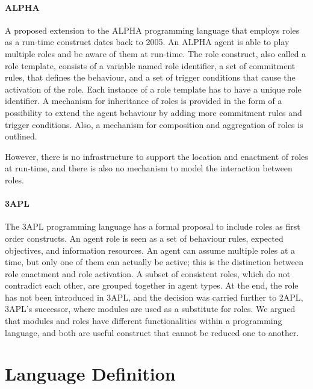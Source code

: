 \documentclass[a4paper,12pt,oneside,fleqn]{book} %
\begin{document}
{%

\subsubsection{ALPHA} %
A proposed extension to the ALPHA programming language that employs roles
as a run-time construct dates back to 2005\cite{Collier_arole-based}. An
ALPHA agent is able to play multiple roles and be aware of them at
run-time. The role construct, also called a role template, consists of a
variable named role identifier, a set of commitment rules, that defines the
behaviour, and a set of trigger conditions that cause the activation of
the role. Each instance of a role template has to have a unique role
identifier. A mechanism for inheritance of roles is provided in the form of
a possibility to  extend the agent behaviour by adding more commitment
rules and trigger conditions.  Also, a mechanism for composition and
aggregation of roles is outlined.

However, there is no infrastructure to support the location and enactment
of roles at run-time, and there is also no mechanism to model the
interaction between roles.

\subsubsection{3APL} %
The 3APL programming language\cite{DBLP:conf/aose/DastaniRHDM04} has a
formal proposal to include roles as first order constructs. An agent role
is seen as a set of behaviour rules, expected objectives, and information
resources. An agent can assume multiple roles at a time, but only one of
them can actually be active; this is the distinction between role enactment
and role activation. A subset of consistent roles, which do not contradict
each other, are grouped together in agent types. At the end, the role has
not been introduced in 3APL, and the decision was carried further to
2APL\cite{DBLP:journals/aamas/Dastani08}, 3APL's successor, where modules
are used as a substitute for roles. We argued that modules and roles have
different functionalities within a programming language, and both are
useful construct that cannot be reduced one to another.


\chapter{Language Definition}\label{ch:langdef} %

}
\end{document}
